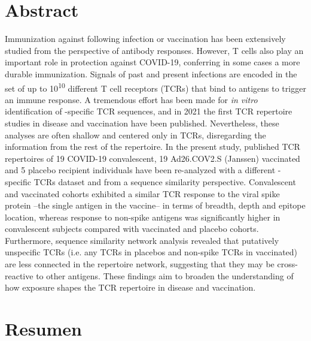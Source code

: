 \chapter*{Abstract}
\label{cap:abs}

\setcounter{page}{1}

Immunization against \covid{} following infection or vaccination has been extensively studied from the perspective of antibody responses. However, T cells also play an important role in protection against COVID-19, conferring in some cases a more durable immunization. Signals of past and present infections are encoded in the set of up to 10\textsuperscript{10} different T cell receptors (TCRs) that bind to antigens to trigger an immune response. A tremendous effort has been made for \textit{in vitro} identification of \covid-specific TCR sequences, and in 2021 the first TCR repertoire studies in disease and vaccination have been published. Nevertheless, these analyses are often shallow and centered only in \covid{} TCRs, disregarding the information from the rest of the repertoire. In the present study, published TCR repertoires of 19 COVID-19 convalescent, 19 Ad26.COV2.S (Janssen) vaccinated and 5 placebo recipient individuals have been re-analyzed with a different \covid-specific TCRs dataset and from a sequence similarity perspective. Convalescent and vaccinated cohorts exhibited a similar TCR response to the viral spike protein --the single antigen in the vaccine-- in terms of breadth, depth and epitope location, whereas response to non-spike antigens was significantly higher in convalescent subjects compared with vaccinated and placebo cohorts. Furthermore, sequence similarity network analysis revealed that putatively unspecific TCRs (i.e. any \covid{} TCRs in placebos and non-spike TCRs in vaccinated) are less connected in the repertoire network, suggesting that they may be cross-reactive to other antigens. These findings aim to broaden the understanding of how \covid{} exposure shapes the TCR repertoire in disease and vaccination.

\vspace{1cm}


\chapter*{Resumen}

